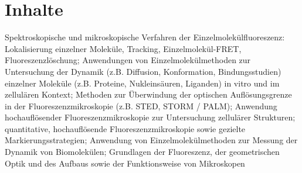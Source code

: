 \section{Inhalte}
Spektroskopische und mikroskopische Verfahren der Einzelmolekülfluoreszenz: Lokalisierung einzelner Moleküle, Tracking, Einzelmolekül-FRET, Fluoreszenzlöschung; Anwendungen von Einzelmolekülmethoden zur Untersuchung der Dynamik (z.B. Diffusion, Konformation, Bindungsstudien) einzelner Moleküle (z.B. Proteine, Nukleinsäuren, Liganden) in vitro und im zellulären Kontext; Methoden zur Überwindung der optischen Auflösungsgrenze in der Fluoreszenzmikroskopie (z.B. STED, STORM / PALM); Anwendung hochauflösender Fluoreszenzmikroskopie zur Untersuchung zellulärer Strukturen; quantitative, hochauflösende Fluoreszenzmikroskopie sowie gezielte Markierungsstrategien; Anwendung von Einzelmolekülmethoden zur Messung der Dynamik von Biomolekülen; Grundlagen der Fluoreszenz, der geometrischen Optik und des Aufbaus sowie der Funktionsweise von Mikroskopen